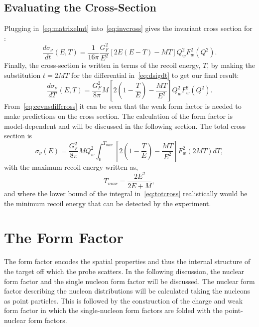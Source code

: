 \subsection{Evaluating the Cross-Section}
\label{sec:evalcross}

Plugging in~\eqref{eq:matrixelmt} into~\eqref{eq:invcross} gives the invariant cross section for \cevns :
\begin{equation}\label{eq:dsigdt}
\frac{d\sigma _{\nu}}{dt}(E,T) = \frac{1}{16\pi} \frac{G_F^2}{E^2}\left[ 2E(E-T)-MT \right] Q_{w}^2 F_{w}^2(Q^2).
\end{equation}
Finally, the cross-section is written in terms of the recoil energy, $T$, by making the substitution $t=2MT$ for the differential in~\eqref{eq:dsigdt} to get our final result:
\begin{equation}\label{eq:cevnsdiffcross}
\frac{d\sigma _{\nu}}{dT}(E,T) = \frac{G_F^2}{8\pi}M \left[ 2\left(1-\frac{T}{E}\right) - \frac{MT}{E^2} \right] Q_{w}^2 F_{w}^2(Q^2).
\end{equation}
From~\eqref{eq:cevnsdiffcross} it can be seen that the weak form factor is needed to make predictions on the cross section. The calculation of the form factor is model-dependent and will be discussed in the following section. The total cross section is
\begin{equation}\label{eq:totcross}
\sigma _{\nu}(E) = \frac{G_F^2}{8\pi}M Q_{w}^2 \int_{0}^{ T_{max}}\left[ 2 \left( 1- \frac{T}{E} \right) -\frac{MT}{E^2} \right] F_{w}^2(2MT) dT,
\end{equation}
with the maximum recoil energy written as,
\begin{equation}\label{eq:Tmax}
T_{max}=\frac{2E^2}{2E+M},
\end{equation}
and where the lower bound of the integral in~\eqref{eq:totcross} realistically would be the minimum recoil energy that can be detected by the experiment.  

\section{The Form Factor}

The form factor encodes the spatial properties and thus the internal structure of the target off which the probe scatters. In the following discussion, the nuclear form factor and the single nucleon form factor will be discussed. The nuclear form factor describing the nucleon distributions will be calculated taking the nucleons as point particles. This is followed by the construction of the charge and weak form factor in which the single-nucleon form factors are folded with the point-nuclear form factors. 

